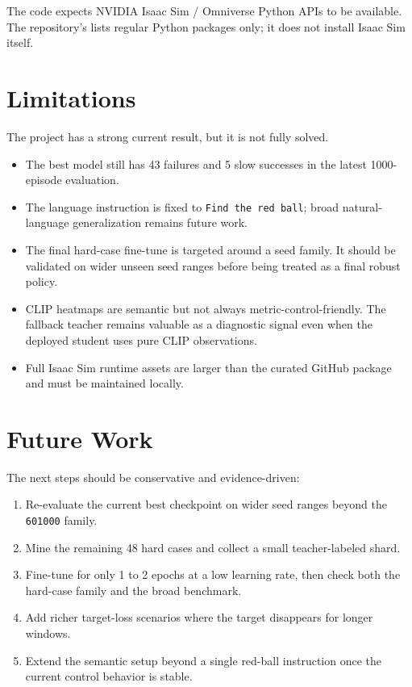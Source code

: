 \documentclass[11pt]{article}
\begin{document}
The code expects NVIDIA Isaac Sim / Omniverse Python APIs to be available. The
repository's  lists regular Python packages only; it
does not install Isaac Sim itself.

\section{Limitations}

The project has a strong current result, but it is not fully solved.

\begin{itemize}
  \item The best model still has 43 failures and 5 slow successes in the latest
  1000-episode evaluation.
  \item The language instruction is fixed to \texttt{Find the red ball}; broad
  natural-language generalization remains future work.
  \item The final hard-case fine-tune is targeted around a seed family. It
  should be validated on wider unseen seed ranges before being treated as a
  final robust policy.
  \item CLIP heatmaps are semantic but not always metric-control-friendly. The
  fallback teacher remains valuable as a diagnostic signal even when the
  deployed student uses pure CLIP observations.
  \item Full Isaac Sim runtime assets are larger than the curated GitHub
  package and must be maintained locally.
\end{itemize}

\section{Future Work}

The next steps should be conservative and evidence-driven:

\begin{enumerate}
  \item Re-evaluate the current best checkpoint on wider seed ranges beyond
  the \texttt{601000} family.
  \item Mine the remaining 48 hard cases and collect a small teacher-labeled
  shard.
  \item Fine-tune for only 1 to 2 epochs at a low learning rate, then check
  both the hard-case family and the broad benchmark.
  \item Add richer target-loss scenarios where the target disappears for longer
  windows.
  \item Extend the semantic setup beyond a single red-ball instruction once the
  current control behavior is stable.
\end{enumerate}
\end{document}
